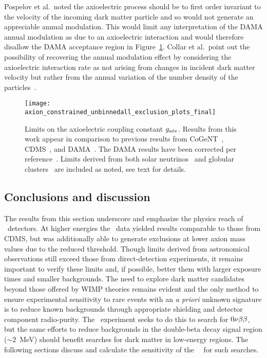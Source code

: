 	Pospelov et al.~noted the axioelectric process should be to first order invariant to the velocity of the incoming dark matter particle and so would not generate an appreciable annual modulation.  This would limit any interpretation of the DAMA annual modulation as due to an axioelectric interaction and would therefore disallow the DAMA acceptance region in Figure~\ref{fig:HeavyAxionLimits}.  Collar et al.~point out the possibility of recovering the annual modulation effect by considering the axioelectric interaction rate as not arising from changes in incident dark matter velocity but rather from the annual variation of the number density of the particles~\cite{Collar:2009sp}. 
			
		\begin{figure}
			\centering
			\texttt{[image: axion\_constrained\_unbinnedall\_exclusion\_plots\_final]}
			\caption[Limits on the axioelectric coupling constant $\gaa$]{Limits on the axioelectric 
			coupling constant $\gaa$.  Results from this work appear in comparison to previous 
			results from CoGeNT~\cite{Aalseth:2008aa}, CDMS~\cite{Ahmed2009}, and 
			DAMA~\cite{Bernabei:2005ca}.  The DAMA results have been corrected per 
			reference~\cite{Collar:2009sp}.  Limits derived from both solar neutrinos~\cite{Gondolo09} and globular clusters~\cite{Raffelt95} are included as noted, see text for details.}
			\label{fig:HeavyAxionLimits}
		\end{figure}
		
	\subsection{Conclusions and discussion}
	\label{sec:DiscOnHeavyAxionLimits}	

	
	The results from this section underscore and emphasize the physics reach of \ppc~detectors. At higher energies the \bege~data yielded results comparable to those from CDMS, but was additionally able to generate exclusions at lower axion mass values due to the reduced threshold.  Though limits derived from astronomical observations still exceed those from direct-detection experiments, it remains important to verify these limits and, if possible, better them with larger exposure times and smaller backgrounds.  The need to explore dark matter candidates beyond those offered by WIMP theories remains evident and the only method to ensure experimental sensitivity to rare events with an \emph{a priori} unknown signature is to reduce known backgrounds through appropriate shielding and detector component radio-purity.  The \MJ~experiment seeks to do this to search for $0 \nu \beta \beta$, but the same efforts to reduce backgrounds in the double-beta decay signal region ($\sim2$~MeV) should benefit searches for dark matter in low-energy regions.  The following sections discuss and calculate the sensitivity of the \MJ~\minmod~for such searches.
							
